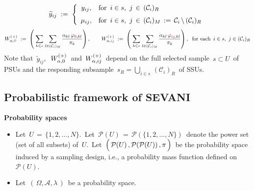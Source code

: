 \begin{equation*}
\widetilde{y}_{ij}
\; := \;
    \left\{\begin{array}{cl}
        y_{ij}, & \textnormal{for \,$i \in s$,\, $j \,\in\, (\mathcal{C}_{i})_{R}$}
        \\
        \overset{{\color{white}\textnormal{\large1}}}{\mu_{ij}}, & \textnormal{for \,$i \in s$,\, $j \,\in\, (\mathcal{C}_{i})_{M} \,:=\, \mathcal{C}_{i} \,\backslash\, (\mathcal{C}_{i})_{R}$}
        \end{array}\right.
\end{equation*}
\begin{equation*}
W^{(+)}_{\alpha,{\color{red}0}}
\; := \;
    \left(\;
        \underset{k \in s}{\sum}\;
        \underset{l \in (\mathcal{C}_{i})_{M}}{\sum}\,
        \dfrac{
            \alpha_{kl}\,\varphi_{{\color{red}0},kl}
            }{
            \pi_{k}
            }
        \right),
\quad\quad
W^{(+)}_{\alpha,{\color{red}ij}}
\; := \;
    \left(\;
        \underset{k \in s}{\sum}\;
        \underset{l \in (\mathcal{C}_{i})_{M}}{\sum}\,
        \dfrac{
            \alpha_{kl}\,\varphi_{{\color{red}ij},kl}
            }{
            \pi_{k}
            }
        \right),
\;\;
\textnormal{for each \,$i \in s$,\, $j \in (\mathcal{C}_{i})_{R}$}
\end{equation*}
\vskip 0.3cm
\noindent
Note that
\,$\widetilde{y}_{ij}$,\,
\,$W^{(+)}_{\alpha,{\color{black}0}}$\,
and
\,$W^{(+)}_{\alpha,{\color{black}ij}}$\,
depend on the full selected sample
\,$s \subset U$\,
of PSUs and the responding subsample
\,$s_{R} = \underset{i \in s}{\bigcup}\,(\mathcal{C}_{i})_{R}$\,
of SSUs.


\vskip 1.0cm
\subsection{Probabilistic framework of SEVANI \cite{Beaumont2011}}
\label{GeneralizedTotalProbabilisticFramework}
\setcounter{theorem}{0}


\noindent
\textbf{Probability spaces}
\begin{itemize}
\item
    Let
    \,$U \,=\, \{1,2,\ldots,N\}$.\,
    Let
    \,$\mathcal{P}(U) \,=\, \mathcal{P}(\{1,2,\ldots,N\})$\,
    denote the power set (set of all subsets) of \,$U$.\,
    Let
    \,$\left(\,\mathcal{P}(U)\,,\mathcal{P}(\mathcal{P}(U))\,,\overset{{\color{white}-}}{\pi}\,\right)$\,
    be the probability space induced by a sampling design, i.e.,
    a probability mass function defined on
    \,$\mathcal{P}(U)$.\,
\item
    Let \,$\left(\,\Omega,\mathscr{A},\lambda\,\right)$\, be a probability space.
\end{itemize}

